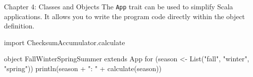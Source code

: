 \begin{notes}{Chapter 4: Classes and Objects}
    The \texttt{App} trait can be used to simplify Scala applications. It allows you to write the program code directly within the object definition.

    \begin{highlight}
    \begin{code}[Scala]
    import ChecksumAccumulator.calculate

    object FallWinterSpringSummer extends App {
        for (season <- List("fall", "winter", "spring"))
            println(season + ": " + calculate(season))
    }
    \end{code}
    \end{highlight}
\end{notes}
